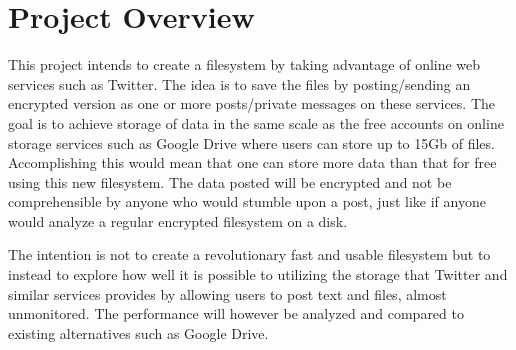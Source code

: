 \section{Project Overview}

This project intends to create a filesystem by taking advantage of online web services such as Twitter. The idea is to save the files by posting/sending an encrypted version as one or more posts/private messages on these services. The goal is to achieve storage of data in the same scale as the free accounts on online storage services such as Google Drive where users can store up to 15Gb of files. Accomplishing this would mean that one can store more data than that for free using this new filesystem. The data posted will be encrypted and not be comprehensible by anyone who would stumble upon a post, just like if anyone would analyze a regular encrypted filesystem on a disk. 

The intention is not to create a revolutionary fast and usable filesystem but to instead to explore how well it is possible to utilizing the storage that Twitter and similar services provides by allowing users to post text and files, almost unmonitored. The performance will however be analyzed and compared to existing alternatives such as Google Drive.
